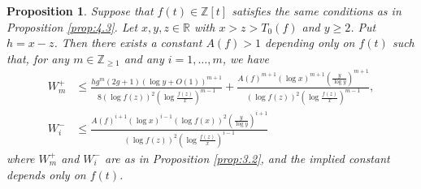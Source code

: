 \documentclass[a4paper,11pt]{amsart}
\newtheorem{proposition}[theorem]{Proposition}
\theoremstyle{definition}
\numberwithin{equation}{section}
\begin{document}
\begin{proposition}\label{prop:4.4}
Suppose that $f(t) \in \mathbb{Z}[t]$ satisfies the same conditions as in Proposition \ref{prop:4.3}. 
Let $x,y,z \in \mathbb{R}$ with $x>z>T_0(f)$ and $y \geq2$. 
Put $h=x-z$. 
Then there exists a constant $A(f)>1$ depending only on $f(t)$ such that, for any $m \in \mathbb{Z}_{\geq1}$ and any $i =1,\ldots,m$, we have 
\begin{align*}
W_m^+
&\leq \frac{hg^m (2g+1) (\log{y}+O(1))^{m+1}}{8(\log{f(z)})^2 \left(\log{\frac{f(z)}{x}}\right)^{m-1}} 
+ \frac{A(f)^{m+1} (\log{x})^{m+1} \left(\frac{y}{\log{y}}\right)^{m+1} }{(\log{f(z)})^2 \left(\log{\frac{f(z)}{x}}\right)^{m-1}}, \\
W_i^-
&\leq \frac{A(f)^{i+1} (\log{x})^{i-1} (\log{f(x)})^2 \left(\frac{y}{\log{y}}\right)^{i+1} }{(\log{f(z)})^2 \left(\log{\frac{f(z)}{x}}\right)^{i-1}} 
\end{align*}
where $W_m^+$ and $W_i^-$ are as in Proposition \ref{prop:3.2}, and the implied constant depends only on $f(t)$. 
\end{proposition}
\end{document}
